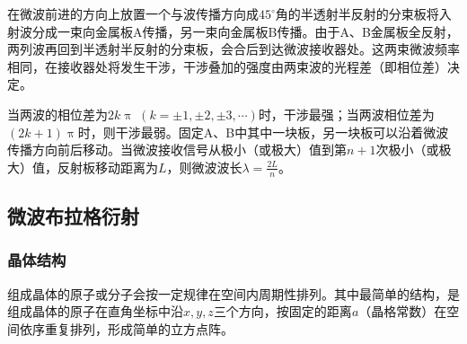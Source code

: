 \documentclass[UTF-8,twoside,cs4size]{ctexart}
\begin{document}
	在微波前进的方向上放置一个与波传播方向成$ 45^{\circ} $角的半透射半反射的分束板将入射波分成一束向金属板A传播，另一束向金属板B传播。由于A、B金属板全反射，两列波再回到半透射半反射的分束板，会合后到达微波接收器处。这两束微波频率相同，在接收器处将发生干涉，干涉叠加的强度由两束波的光程差（即相位差）决定。
	
	当两波的相位差为$ 2k\uppi\;(k=\pm1,\pm2,\pm3,\cdots) $时，干涉最强；当两波相位差为$ (2k+1)\uppi $时，则干涉最弱。固定A、B中其中一块板，另一块板可以沿着微波传播方向前后移动。当微波接收信号从极小（或极大）值到第$ n+1 $次极小（或极大）值，反射板移动距离为$ L $，则微波波长$ \lambda=\frac{2L}{n} $。
	
	\subsection{微波布拉格衍射}
		\subsubsection{晶体结构}
		组成晶体的原子或分子会按一定规律在空间内周期性排列。其中最简单的结构，是组成晶体的原子在直角坐标中沿$ x,y,z $三个方向，按固定的距离$ a $（晶格常数）在空间依序重复排列，形成简单的立方点阵。
		
\end{document}
